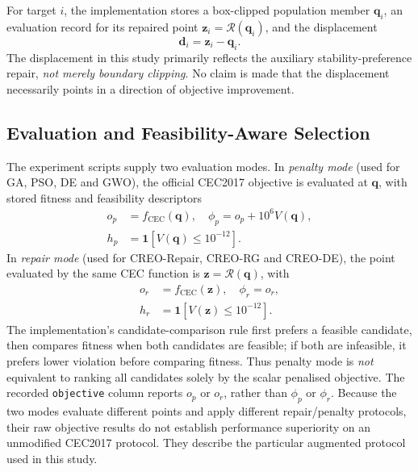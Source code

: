 \documentclass[a4paper,fleqn]{cas-sc}
\begin{document}
For target $i$, the implementation stores a box-clipped population member $\mathbf{q}_i$, an evaluation record for its repaired point $\mathbf{z}_i=\mathcal{R}(\mathbf{q}_i)$, and the displacement
\begin{equation}
\mathbf{d}_i=\mathbf{z}_i-\mathbf{q}_i.
\label{eq:repairdisp}
\end{equation}
The displacement in this study primarily reflects the auxiliary stability-preference repair, \emph{not merely boundary clipping}. No claim is made that the displacement necessarily points in a direction of objective improvement.

\subsection{Evaluation and Feasibility-Aware Selection}

The experiment scripts supply two evaluation modes. In \emph{penalty mode} (used for GA, PSO, DE and GWO), the official CEC2017 objective is evaluated at $\mathbf{q}$, with stored fitness and feasibility descriptors
\begin{equation}
\begin{split}
  o_p&=f_{\mathrm{CEC}}(\mathbf{q}),\quad
  \phi_p=o_p+10^6 V(\mathbf{q}),\\
  h_p&=\mathbf{1}\!\left[V(\mathbf{q})\leq10^{-12}\right].
\end{split}
\label{eq:penalty}
\end{equation}
In \emph{repair mode} (used for CREO-Repair, CREO-RG and CREO-DE), the point evaluated by the same CEC function is $\mathbf{z}=\mathcal{R}(\mathbf{q})$, with
\begin{equation}
\begin{split}
 o_r&=f_{\mathrm{CEC}}(\mathbf{z}),\quad \phi_r=o_r,\\
 h_r&=\mathbf{1}\!\left[V(\mathbf{z})\leq10^{-12}\right].
\end{split}
\label{eq:repairmode}
\end{equation}
The implementation's candidate-comparison rule first prefers a feasible candidate, then compares fitness when both candidates are feasible; if both are infeasible, it prefers lower violation before comparing fitness. Thus penalty mode is \emph{not} equivalent to ranking all candidates solely by the scalar penalised objective. The recorded \texttt{objective} column reports $o_p$ or $o_r$, rather than $\phi_p$ or $\phi_r$. Because the two modes evaluate different points and apply different repair/penalty protocols, their raw objective results do not establish performance superiority on an unmodified CEC2017 protocol. They describe the particular augmented protocol used in this study.
\end{document}
